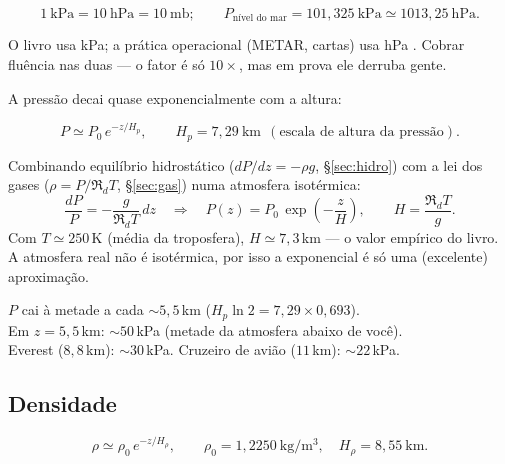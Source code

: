 \documentclass[11pt]{article}
\begin{document}
\begin{formalivro}[unidades]
\[ 1\ \mathrm{kPa} = 10\ \mathrm{hPa} = 10\ \mathrm{mb};\qquad
P_{\text{nível do mar}} = 101{,}325\ \mathrm{kPa} \simeq 1013{,}25\ \mathrm{hPa}. \]
\end{formalivro}

O livro usa kPa; a prática operacional (METAR, cartas) usa hPa
. Cobrar fluência nas duas — o fator é só $10\times$, mas
em prova ele derruba gente.

A pressão decai quase exponencialmente com a altura:

\begin{formalivro}
\[ P \simeq P_0\, e^{-z/H_p}, \qquad H_p = 7{,}29\ \mathrm{km}
\ \ (\text{escala de altura da pressão}). \]
\end{formalivro}

\begin{formadif}
Combinando equilíbrio hidrostático ($dP/dz=-\rho g$, \S\ref{sec:hidro}) com a
lei dos gases ($\rho = P/\Re_d T$, \S\ref{sec:gas}) numa atmosfera isotérmica:
\[ \frac{dP}{P} = -\frac{g}{\Re_d T}\,dz
\quad\Longrightarrow\quad
P(z) = P_0\, \exp\!\left(-\frac{z}{H}\right),\qquad H = \frac{\Re_d T}{g}. \]
Com $T\simeq250$\,K (média da troposfera), $H\simeq7{,}3$\,km — o valor
empírico do livro. A atmosfera real não é isotérmica, por isso a exponencial
é só uma (excelente) aproximação.
\end{formadif}

\begin{noquadro}
$P$ cai à metade a cada $\sim 5{,}5$\,km\quad
($H_p \ln 2 = 7{,}29\times0{,}693$).\\
Em $z=5{,}5$\,km: $\sim 50$\,kPa (metade da atmosfera abaixo de você).\\
Everest ($8{,}8$\,km): $\sim 30$\,kPa. Cruzeiro de avião ($11$\,km):
$\sim 22$\,kPa.
\end{noquadro}


\subsection{Densidade}

\begin{formalivro}
\[ \rho \simeq \rho_0\, e^{-z/H_\rho}, \qquad
\rho_0 = 1{,}2250\ \mathrm{kg/m^3},\quad H_\rho = 8{,}55\ \mathrm{km}. \]
\end{formalivro}
\end{document}
